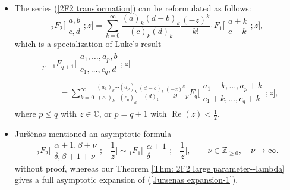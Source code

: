 \documentclass[11pt]{article}
\numberwithin{equation}{section}
\numberwithin{equation}{section}
\newcommand{\CC}{\ensuremath{\mathbb{C}}}
\newcommand{\ZZ}{\ensuremath{\mathbb{Z}}}
\begin{document}
\begin{Remark}
	~
	\begin{itemize}\itemsep=0pt
		\item[(1)] The series (\ref{2F2 transformation}) can be reformulated as follows:
		\begin{equation}\label{2F2 transformation reformulated}
			{}_2F_2\biggl[\begin{matrix}
				a,b\\
				c,d
			\end{matrix};z\biggr]=\sum_{k=0}^{\infty}\frac{(a)_k(d-b)_k}{(c)_k(d)_k}\frac{(-z)^k}{k!}{}_1F_1\biggl[\begin{matrix}
				a+k\\
				c+k
			\end{matrix};z\biggr],
		\end{equation}
		which is a specialization of Luke's result \cite[Section~9.1, equation~(34)]{Luke-1969}
		\begin{align}
					&{}_{p+1}F_{q+1}\biggl[\begin{matrix}
						a_1,\dots,a_p,b\\
						c_1,\dots,c_q,d
					\end{matrix};z\biggr]{}\nonumber\\
 & \qquad{}= \sum_{k=0}^{\infty}\frac{ (a_1 )_k\cdots (a_p )_k}{ (c_1 )_k\cdots (c_q )_k}\frac{(d-b)_k}{(d)_k}
 \frac{(-z)^k}{k!}{}_{p}F_{q}\biggl[\begin{matrix}
						a_1+k,\dots,a_p+k\\
						c_1+k,\dots,c_q+k
					\end{matrix};z\biggr],\label{pFp transformation}
\end{align}
			where $p\leqslant q$ with $z\in\CC$, or $p=q+1$ with $\operatorname{Re}(z)<\frac{1}{2}$.
		
		\item[(2)] Jur\v{s}\.enas \cite[Section~4.1, p.~69]{Jursenas-2014} mentioned an asymptotic formula
		\begin{equation}\label{Jursenas expansion-1}
			{}_2F_2\biggl[\begin{matrix}
				\alpha+1,\beta+\nu\\
				\delta,\beta+1+\nu
			\end{matrix};-\frac{1}{z}\biggr]\sim {}_1F_1\biggl[\begin{matrix}
				\alpha+1\\
				\delta
			\end{matrix};-\frac{1}{z}\biggr],\qquad \nu\in\ZZ_{\geqslant 0},\quad\nu\to \infty.
		\end{equation}
		without proof, whereas our Theorem \ref{Thm: 2F2 large parameter--lambda} gives a full asymptotic expansion of (\ref{Jursenas expansion-1}).
	\end{itemize}
\end{Remark}
\end{document}
